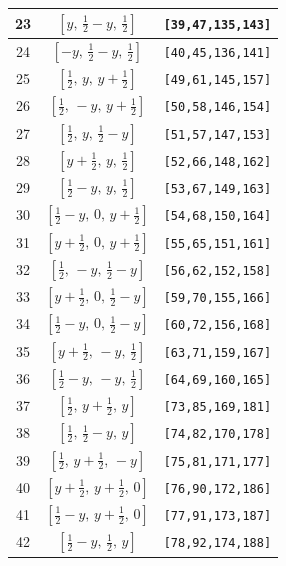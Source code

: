 \documentclass[fleqn,8pt]{jsarticle}
\begin{document}
\begin{longtable}{ccc}
23 & $\left[ y,\, \frac{1}{2} - y,\, \frac{1}{2} \right]$ & {\tt [39,47,135,143]} \\ \hline
24 & $\left[ - y,\, \frac{1}{2} - y,\, \frac{1}{2} \right]$ & {\tt [40,45,136,141]} \\ \hline
25 & $\left[ \frac{1}{2},\, y,\, y + \frac{1}{2} \right]$ & {\tt [49,61,145,157]} \\ \hline
26 & $\left[ \frac{1}{2},\, - y,\, y + \frac{1}{2} \right]$ & {\tt [50,58,146,154]} \\ \hline
27 & $\left[ \frac{1}{2},\, y,\, \frac{1}{2} - y \right]$ & {\tt [51,57,147,153]} \\ \hline
28 & $\left[ y + \frac{1}{2},\, y,\, \frac{1}{2} \right]$ & {\tt [52,66,148,162]} \\ \hline
29 & $\left[ \frac{1}{2} - y,\, y,\, \frac{1}{2} \right]$ & {\tt [53,67,149,163]} \\ \hline
30 & $\left[ \frac{1}{2} - y,\, 0,\, y + \frac{1}{2} \right]$ & {\tt [54,68,150,164]} \\ \hline
31 & $\left[ y + \frac{1}{2},\, 0,\, y + \frac{1}{2} \right]$ & {\tt [55,65,151,161]} \\ \hline
32 & $\left[ \frac{1}{2},\, - y,\, \frac{1}{2} - y \right]$ & {\tt [56,62,152,158]} \\ \hline
33 & $\left[ y + \frac{1}{2},\, 0,\, \frac{1}{2} - y \right]$ & {\tt [59,70,155,166]} \\ \hline
34 & $\left[ \frac{1}{2} - y,\, 0,\, \frac{1}{2} - y \right]$ & {\tt [60,72,156,168]} \\ \hline
35 & $\left[ y + \frac{1}{2},\, - y,\, \frac{1}{2} \right]$ & {\tt [63,71,159,167]} \\ \hline
36 & $\left[ \frac{1}{2} - y,\, - y,\, \frac{1}{2} \right]$ & {\tt [64,69,160,165]} \\ \hline
37 & $\left[ \frac{1}{2},\, y + \frac{1}{2},\, y \right]$ & {\tt [73,85,169,181]} \\ \hline
38 & $\left[ \frac{1}{2},\, \frac{1}{2} - y,\, y \right]$ & {\tt [74,82,170,178]} \\ \hline
39 & $\left[ \frac{1}{2},\, y + \frac{1}{2},\, - y \right]$ & {\tt [75,81,171,177]} \\ \hline
40 & $\left[ y + \frac{1}{2},\, y + \frac{1}{2},\, 0 \right]$ & {\tt [76,90,172,186]} \\ \hline
41 & $\left[ \frac{1}{2} - y,\, y + \frac{1}{2},\, 0 \right]$ & {\tt [77,91,173,187]} \\ \hline
42 & $\left[ \frac{1}{2} - y,\, \frac{1}{2},\, y \right]$ & {\tt [78,92,174,188]} \\ \hline

\end{longtable}
\end{document}
